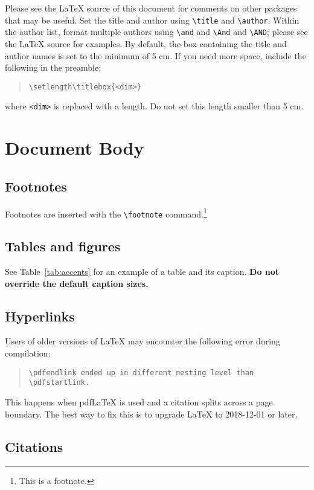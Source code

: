 \documentclass[11pt]{article}
\begin{document}
Please see the \LaTeX{} source of this document for comments on other packages that may be useful.
Set the title and author using \verb|\title| and \verb|\author|. Within the author list, format multiple authors using \verb|\and| and \verb|\And| and \verb|\AND|; please see the \LaTeX{} source for examples.
By default, the box containing the title and author names is set to the minimum of 5 cm. If you need more space, include the following in the preamble:
\begin{quote}
\begin{verbatim}
\setlength\titlebox{<dim>}
\end{verbatim}
\end{quote}
where \verb|<dim>| is replaced with a length. Do not set this length smaller than 5 cm.

\section{Document Body}

\subsection{Footnotes}

Footnotes are inserted with the \verb|\footnote| command.\footnote{This is a footnote.}

\subsection{Tables and figures}

See Table~\ref{tab:accents} for an example of a table and its caption.
\textbf{Do not override the default caption sizes.}

\subsection{Hyperlinks}

Users of older versions of \LaTeX{} may encounter the following error during compilation: 
\begin{quote}
\tt\verb|\pdfendlink| ended up in different nesting level than \verb|\pdfstartlink|.
\end{quote}
This happens when pdf\LaTeX{} is used and a citation splits across a page boundary. The best way to fix this is to upgrade \LaTeX{} to 2018-12-01 or later.

\subsection{Citations}
\end{document}

